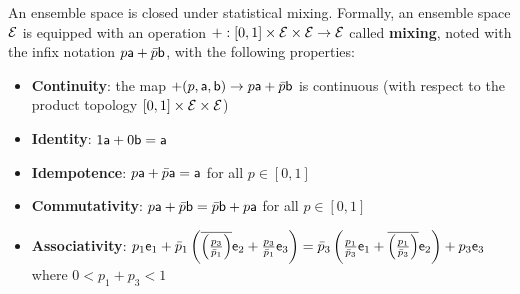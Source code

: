 \begin{axiom}
	An ensemble space is closed under statistical mixing. Formally, an ensemble space $\Ens$ is equipped with an operation $+ : [0, 1] \times \Ens \times \Ens \to \Ens$ called \textbf{mixing}, noted with the infix notation $p \ens[a] + \bar{p} \ens[b]$, with the following properties:
	\begin{itemize}
		\item \textbf{Continuity}: the map $+(p, \ens[a], \ens[b])  \to p \ens[a] + \bar{p} \ens[b]$ is continuous (with respect to the product topology $[0, 1] \times \Ens \times \Ens$)
		\item \textbf{Identity}: $1 \ens[a] + 0 \ens[b] = \ens[a]$
		\item \textbf{Idempotence}:  $p \ens[a] + \bar{p} \ens[a] = \ens[a]$ for all $p \in [0,1]$
		\item \textbf{Commutativity}: $p \ens[a] + \bar{p} \ens[b] = \bar{p} \ens[b] + p \ens[a]$ for all $p \in [0,1]$
		\item \textbf{Associativity}: $p_1 \ens_1 + \bar{p}_1\left(\overline{\left(\frac{p_3}{\bar{p}_1}\right)}\ens_2 + \frac{p_3}{\bar{p}_1}\ens_3\right) =  \bar{p}_3\left(\frac{p_1}{\bar{p}_3} \ens_1 +  \overline{\left(\frac{p_1}{\bar{p}_3}\right)}\ens_2\right) + p_3 \ens_3$ where $0 < p_1 + p_3 < 1$
	\end{itemize}
\end{axiom}

